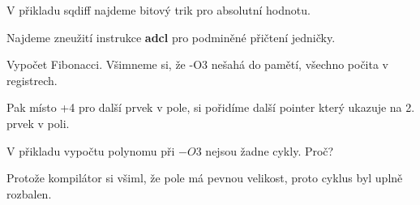 \begin{example}
	V přikladu sqdiff najdeme bitový trik pro absolutní hodnotu.
\end{example}

\begin{example}
	Najdeme zneužití instrukce \textbf{adcl} pro podminěné přičtení jedničky.
\end{example}

\begin{example}
	Vypočet Fibonacci. Všimneme si, že -O3 nešahá do pamětí, všechno počita v registrech.

	Pak místo +4 pro další prvek v pole, si pořidíme další pointer který ukazuje na 2. prvek v poli.
\end{example}

\begin{example}
	V přikladu vypočtu polynomu při $-O3$ nejsou žadne cykly. Proč?

	Protože kompilátor si všiml, že pole má pevnou velikost, proto cyklus byl uplně rozbalen.
\end{example}
